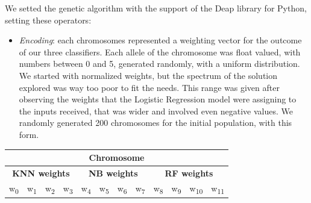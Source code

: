 We setted the genetic algorithm with the support of the Deap library for Python, setting these operators:
\begin{itemize}
	\item[\PencilRight]\textit{Encoding}: each chromosomes represented a weighting vector for the outcome of our three classifiers. Each allele of the chromosome was float valued, with numbers between 0 and 5, generated randomly, with a uniform distribution. We started with normalized weights, but the spectrum of the solution explored was way too poor to fit the needs.
	This range was given after observing the weights that the Logistic Regression model were assigning to the inputs received, that was wider and involved even negative values.
	We randomly generated 200 chromosomes for the initial population, with this form.
\end{itemize}
\begin{center}
	\begin{tabular}{@{}c|c|c|c|c|c|c|c|c|c|c|c@{}}
		\multicolumn{12}{c}{Chromosome} \\
		\hline
		\multicolumn{4}{c|}{\textbf{KNN weights}} & 
		\multicolumn{4}{c|}{\textbf{NB weights}} & 
		\multicolumn{4}{c}{\textbf{RF weights}}\\
		\hline
		\multicolumn{1}{c|}{w\textsubscript{0}} &
		\multicolumn{1}{c|}{w\textsubscript{1}} &
		\multicolumn{1}{c|}{w\textsubscript{2}} &
		\multicolumn{1}{c|}{w\textsubscript{3}} &
		\multicolumn{1}{c|}{w\textsubscript{4}} &
		\multicolumn{1}{c|}{w\textsubscript{5}} &
		\multicolumn{1}{c|}{w\textsubscript{6}} &
		\multicolumn{1}{c|}{w\textsubscript{7}} &	
		\multicolumn{1}{c|}{w\textsubscript{8}} &
		\multicolumn{1}{c|}{w\textsubscript{9}} &
		\multicolumn{1}{c|}{w\textsubscript{10}} &
		\multicolumn{1}{c}{w\textsubscript{11}}\\
		\hline
	\end{tabular}
\end{center}

